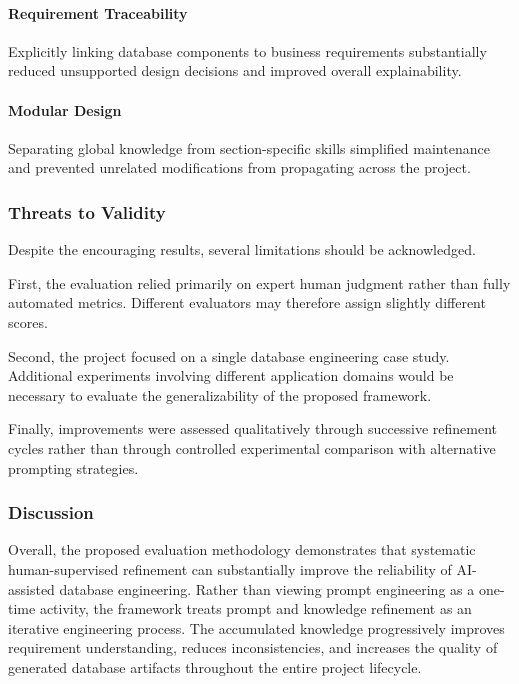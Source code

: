 \paragraph{Requirement Traceability}

Explicitly linking database components to business requirements substantially reduced unsupported design decisions and improved overall explainability.

\paragraph{Modular Design}

Separating global knowledge from section-specific skills simplified maintenance and prevented unrelated modifications from propagating across the project.

\subsubsection{Threats to Validity}

Despite the encouraging results, several limitations should be acknowledged.

First, the evaluation relied primarily on expert human judgment rather than fully automated metrics. Different evaluators may therefore assign slightly different scores.

Second, the project focused on a single database engineering case study. Additional experiments involving different application domains would be necessary to evaluate the generalizability of the proposed framework.

Finally, improvements were assessed qualitatively through successive refinement cycles rather than through controlled experimental comparison with alternative prompting strategies.

\subsubsection{Discussion}

Overall, the proposed evaluation methodology demonstrates that systematic human-supervised refinement can substantially improve the reliability of AI-assisted database engineering. Rather than viewing prompt engineering as a one-time activity, the framework treats prompt and knowledge refinement as an iterative engineering process. The accumulated knowledge progressively improves requirement understanding, reduces inconsistencies, and increases the quality of generated database artifacts throughout the entire project lifecycle.
